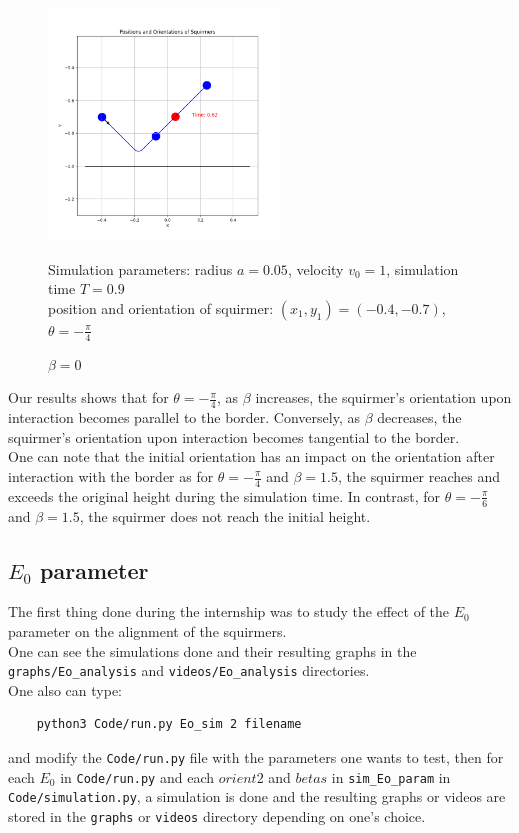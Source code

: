\documentclass{article}
\begin{document}
\begin{figure}[H]
    \centering
    \includegraphics[width=0.55\textwidth]{graphs/simulations/border/beta0/mpi_4.png}
    \caption{\footnotesize $\beta = 0$}
    Simulation parameters: radius $a=0.05$, velocity $v_0=1$, simulation time $T=0.9$\\
        position and orientation of squirmer: $(x_1,y_1)=(-0.4,-0.7)$, $\theta=-\frac{\pi}{4}$
\end{figure}
Our results shows that for $\theta = -\frac{\pi}{4}$, as $\beta$ increases, the squirmer's orientation upon interaction becomes parallel to the border.
Conversely, as $\beta$ decreases, the squirmer's orientation upon interaction becomes tangential to the border.\\
One can note that the initial orientation has an impact on the orientation after interaction with the border as for $\theta = -\frac{\pi}{4}$ and 
$\beta = 1.5$, the squirmer reaches and exceeds the original height during the simulation time. In contrast, for $\theta = -\frac{\pi}{6}$ and 
$\beta = 1.5$, the squirmer does not reach the initial height.

\subsection{$E_0$ parameter}
The first thing done during the internship was to study the effect of the $E_0$ parameter on the alignment of the squirmers.\\
One can see the simulations done and their resulting graphs in the \texttt{graphs/Eo\_analysis} and \texttt{videos/Eo\_analysis} directories.\\
One also can type:
\begin{verbatim}
    python3 Code/run.py Eo_sim 2 filename
\end{verbatim}
and modify the \texttt{Code/run.py} file with the parameters one wants to test,
 then for each $E_0$ in \texttt{Code/run.py} and each $orient2$ and $betas$ in \texttt{sim\_Eo\_param} in \texttt{Code/simulation.py}, 
 a simulation is done and the resulting graphs or videos are stored in the \texttt{graphs} or \texttt{videos} 
 directory depending on one's choice.\\
\end{document}
